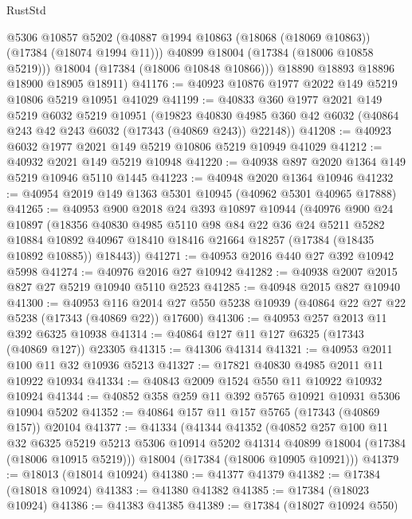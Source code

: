 \begin{lexlean}{RustStd}
\begin{coremodule}
          @5306
          @10857
          @5202
          (@40887 @1994 @10863 (@18068 (@18069 @10863)) (@17384 (@18074 @1994 @11)))
          @40899
          @18004
          (@17384 (@18006 @10858 @5219)))
        @18004
        (@17384 (@18006 @10848 @10866)))
      @18890
      @18893
      @18896
      @18900
      @18905
      @18911)
@41176 := @40923 @10876 @1977 @2022 @149 @5219 @10806 @5219 @10951 @41029
@41199 := @40833
    @360
    @1977
    @2021
    @149
    @5219
    @6032
    @5219
    @10951
    (@19823 @40830 @4985 @360 @42 @6032 (@40864 @243 @42 @243 @6032 (@17343 (@40869 @243)) @22148))
@41208 := @40923 @6032 @1977 @2021 @149 @5219 @10806 @5219 @10949 @41029
@41212 := @40932 @2021 @149 @5219 @10948
@41220 := @40938 @897 @2020 @1364 @149 @5219 @10946 @5110 @1445
@41223 := @40948 @2020 @1364 @10946
@41232 := @40954 @2019 @149 @1363 @5301 @10945 (@40962 @5301 @40965 @17888)
@41265 := @40953
    @900
    @2018
    @24
    @393
    @10897
    @10944
    (@40976
      @900
      @24
      @10897
      (@18356
        @40830
        @4985
        @5110
        @98
        @84
        @22
        @36
        @24
        @5211
        @5282
        @10884
        @10892
        @40967
        @18410
        @18416
        @21664
        @18257
        (@17384 (@18435 @10892 @10885))
        @18443))
@41271 := @40953 @2016 @440 @27 @392 @10942 @5998
@41274 := @40976 @2016 @27 @10942
@41282 := @40938 @2007 @2015 @827 @27 @5219 @10940 @5110 @2523
@41285 := @40948 @2015 @827 @10940
@41300 := @40953
    @116
    @2014
    @27
    @550
    @5238
    @10939
    (@40864 @22 @27 @22 @5238 (@17343 (@40869 @22)) @17600)
@41306 := @40953 @257 @2013 @11 @392 @6325 @10938
@41314 := @40864 @127 @11 @127 @6325 (@17343 (@40869 @127)) @23305
@41315 := @41306 @41314
@41321 := @40953 @2011 @100 @11 @32 @10936 @5213
@41327 := @17821 @40830 @4985 @2011 @11 @10922 @10934
@41334 := @40843 @2009 @1524 @550 @11 @10922 @10932 @10924
@41344 := @40852 @358 @259 @11 @392 @5765 @10921 @10931 @5306 @10904 @5202
@41352 := @40864 @157 @11 @157 @5765 (@17343 (@40869 @157)) @20104
@41377 := @41334
    (@41344
      @41352
      (@40852
        @257
        @100
        @11
        @32
        @6325
        @5219
        @5213
        @5306
        @10914
        @5202
        @41314
        @40899
        @18004
        (@17384 (@18006 @10915 @5219)))
      @18004
      (@17384 (@18006 @10905 @10921)))
@41379 := @18013 (@18014 @10924)
@41380 := @41377 @41379
@41382 := @17384 (@18018 @10924)
@41383 := @41380 @41382
@41385 := @17384 (@18023 @10924)
@41386 := @41383 @41385
@41389 := @17384 (@18027 @10924 @550)

\end{coremodule}
\end{lexlean}
